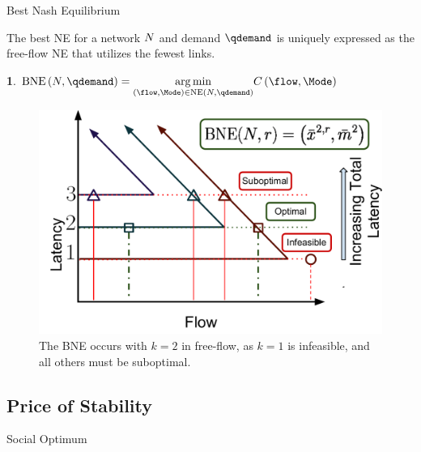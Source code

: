 \documentclass[xcolor=svgnames, english, smaller]{beamer}
\theoremstyle{plain}
\theoremstyle{definition}
\newtheorem{defn}[thm]{\protect\definitionname}
\theoremstyle{plain}
\theoremstyle{plain}
\providecommand{\definitionname}{Definition}
\begin{document}
\begin{frame}{Best Nash Equilibrium}

The best NE for a network $N$ and demand $\qdemand$ is uniquely
expressed as the free-flow NE that utilizes the fewest links.

\begin{defn}
$\BestNashEquilibrium{\NLinks}{\qdemand}=\underset{\left(\flow,\Mode\right)\in\NashEquilibrium{\NLinks}{\qdemand}}{\arg\min}\Latency\left(\flow,\Mode\right)$
\end{defn}

\begin{figure}
\begin{centering}
\includegraphics[scale=0.25]{../../figures/presentation/TheoremBestNashEquilibrium}
\par\end{centering}

\caption{The BNE occurs with $k=2$ in free-flow, as $k=1$ is infeasible,
and all others must be suboptimal.}
\end{figure}


\end{frame}

\subsection{Price of Stability}

\begin{frame}{Social Optimum}


\end{frame}
\end{document}
